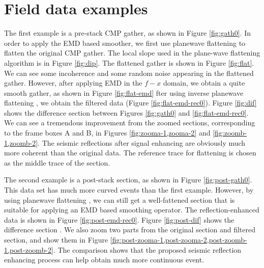 

\section{Field data examples}
The first example is a pre-stack CMP gather, as shown in Figure \ref{fig:gath0}. In order to apply the EMD based smoother, we first use plane\new{-}wave flattening  to flatten the original CMP gather. The local slope used in the plane-wave flattening algorithm is  in Figure \ref{fig:dip}. The flattened gather is shown in Figure \ref{fig:flat}. We can see some incoherence and some random noise appearing in the flattened gather. However, after applying EMD in the $f-x$ domain, we obtain a quite smooth gather, as shown in Figure \ref{fig:flat-emd}\old{,} fter using  inverse plane\new{-}wave flattening , we  obtain the filtered data (Figure \ref{fig:flat-emd-rec0}). Figure \ref{fig:dif} shows the difference section between Figures \ref{fig:gath0} and \ref{fig:flat-emd-rec0}.  We can see a tremendous improvement from the zoomed sections, corresponding to the frame boxes A and B, in Figures \ref{fig:zooma-1,zooma-2} and \ref{fig:zoomb-1,zoomb-2}. The seismic reflections after signal enhancing are obviously much more coherent than the original data. The reference trace for flattening  is chosen as the middle trace of the section. 

The second example is a post-stack section, as shown in Figure \ref{fig:post-gath0}. This data set has much more curved events than the first example. However, by using  plane\new{-}wave flattening , we can still get a well-fattened section that is suitable for applying an EMD based smoothing operator. The reflection-enhanced data is shown in Figure \ref{fig:post-emd-rec0}. Figure \ref{fig:post-dif} shows the difference section . We also zoom two parts from the original section and filtered section, and show them in Figure \ref{fig:post-zooma-1,post-zooma-2,post-zoomb-1,post-zoomb-2}. The comparison   shows that the proposed seismic reflection enhancing process can help obtain much more continuous event.

